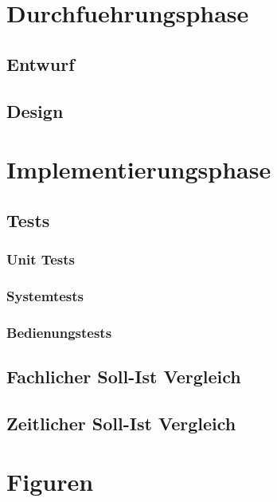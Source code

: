 \documentclass[11pt, a4paper]{article}
\begin{document}
  \section{Durchfuehrungsphase}
    \subsection{Entwurf}
    \subsection{Design}
    \newpage

  \section{Implementierungsphase}
    \subsection{Tests}
      \subsubsection{Unit Tests}
      \subsubsection{Systemtests}
      \subsubsection{Bedienungstests}
    \subsection{Fachlicher Soll-Ist Vergleich}
    \subsection{Zeitlicher Soll-Ist Vergleich}
    \newpage

  \begin{appendix}
    \listoffigures
    \listoftables
  \end{appendix}
  \newpage

  \section{Figuren}
\end{document}
